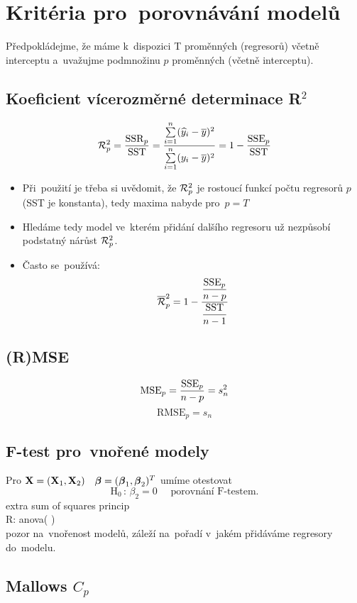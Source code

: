 \section{Kritéria pro~porovnávání modelů}
Předpokládejme, že máme k~dispozici T proměnných (regresorů) včetně interceptu a~uvažujme podmnožinu $p$ proměnných (včetně interceptu).

\subsection{Koeficient vícerozměrné determinace R$^2$}
$$
\mathcal{R}^2_p = \frac{\mathrm{SSR}_p}{\mathrm{SST}} = \dfrac{\sum\limits_{i=1}^{n} ( \widehat{y}_i - \overline{y})^2 }{\sum\limits_{i=1}^{n} (y_i - \overline{y} )^2} = 1 - \frac{\mathrm{SSE}_p}{\mathrm{SST}}
$$
\begin{itemize}
	\item Při~použití je třeba si uvědomit, že $ \mathcal{R}^2_p $ je rostoucí funkcí počtu regresorů $p$ (SST je konstanta), tedy maxima nabyde pro~$p=T$
	\item Hledáme tedy model ve~kterém přidání dalšího regresoru už nezpůsobí podstatný nárůst  $ \mathcal{R}^2_p $.
	\item Často se~používá: 
	$$
	\overline{\mathcal{R}}^2_p = 1 - \dfrac{\dfrac{\mathrm{SSE}_p}{n-p}}{\dfrac{\mathrm{SST}}{n-1}} 
	$$ 
\end{itemize}
\subsection{(R)MSE}
$$
\mathrm{MSE}_p = \dfrac{\mathrm{SSE}_p}{n-p} = s_n^2
$$
$$
\mathrm{RMSE}_p = s_n
$$

\subsection{F-test pro~vnořené modely}
Pro $ \mathbf{X} = (\mathbf{X}_1,\mathbf{X}_2) \quad \boldsymbol{\beta} = ( \boldsymbol{\beta}_1 , \boldsymbol{\beta}_2 )^T $ umíme otestovat
$$
\text{H}_0 \, : \, \beta_2 = 0 \quad \text{ porovnání F-testem.}
$$
extra sum of squares princip \\
R: anova( )\\
pozor na~vnořenost modelů, záleží na~pořadí v~jakém přidáváme regresory do~modelu.



\subsection{Mallows $C_p$}

